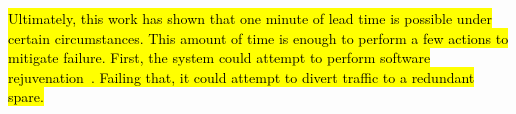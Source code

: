 \hl{Ultimately, this work has shown that one minute of lead time is possible
under certain circumstances.  This amount of time is enough to perform a few
actions to mitigate failure.  First, the system could attempt to perform
software rejuvenation~\citep{candea2004microreboot}.  Failing that, it could
attempt to divert traffic to a redundant spare.}

